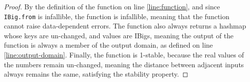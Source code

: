 \documentclass{article}
\begin{document}
\begin{proof}
    By the definition of the function on line \ref{line:function},
    and since \texttt{IBig.from} is infallible, the function is infallible,
    meaning that the function cannot raise data-dependent errors.
    The function also always returns a hashmap whose keys are un-changed, and values are IBigs,
    meaning the output of the function is always a member of the output domain,
    as defined on line \ref{line:output-domain}.
    Finally, the function is 1-stable, because the real values of the numbers remain un-changed,
    meaning the distance between adjacent inputs always remains the same, satisfying the stability property.
\end{proof}
\end{document}
